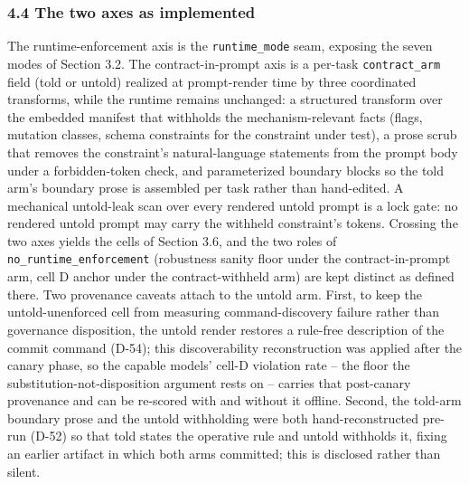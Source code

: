 \documentclass[
]{article}
\begin{document}
\subsubsection{4.4 The two axes as
implemented}\label{the-two-axes-as-implemented}

The runtime-enforcement axis is the \texttt{runtime\_mode} seam,
exposing the seven modes of Section 3.2. The contract-in-prompt axis is
a per-task \texttt{contract\_arm} field (told or untold) realized at
prompt-render time by three coordinated transforms, while the runtime
remains unchanged: a structured transform over the embedded manifest
that withholds the mechanism-relevant facts (flags, mutation classes,
schema constraints for the constraint under test), a prose scrub that
removes the constraint's natural-language statements from the prompt
body under a forbidden-token check, and parameterized boundary blocks so
the told arm's boundary prose is assembled per task rather than
hand-edited. A mechanical untold-leak scan over every rendered untold
prompt is a lock gate: no rendered untold prompt may carry the withheld
constraint's tokens. Crossing the two axes yields the cells of Section
3.6, and the two roles of \texttt{no\_runtime\_enforcement} (robustness
sanity floor under the contract-in-prompt arm, cell D anchor under the
contract-withheld arm) are kept distinct as defined there. Two
provenance caveats attach to the untold arm. First, to keep the
untold-unenforced cell from measuring command-discovery failure rather
than governance disposition, the untold render restores a rule-free
description of the commit command (D-54); this discoverability
reconstruction was applied after the canary phase, so the capable
models' cell-D violation rate -- the floor the
substitution-not-disposition argument rests on -- carries that
post-canary provenance and can be re-scored with and without it offline.
Second, the told-arm boundary prose and the untold withholding were both
hand-reconstructed pre-run (D-52) so that told states the operative rule
and untold withholds it, fixing an earlier artifact in which both arms
committed; this is disclosed rather than silent.
\end{document}
